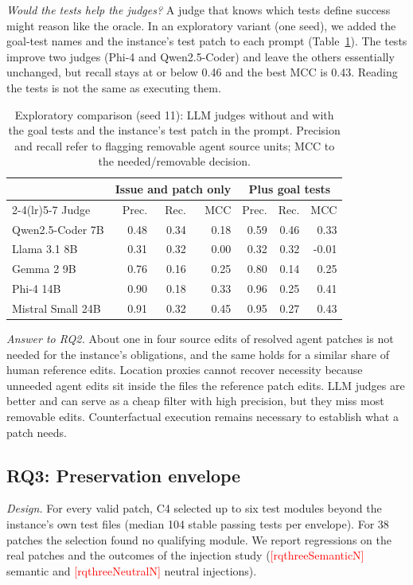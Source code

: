 \documentclass[a4paper,fleqn]{cas-sc}
\newcommand{\pending}[1]{\textcolor{red}{[#1]}}
\newcommand{\rqthreeEnvEmpty}{38}
\newcommand{\rqthreeEnvTestsMedian}{104}
\newcommand{\rqthreeNeutralN}{\pending{rqthreeNeutralN}}
\newcommand{\rqthreeSemanticN}{\pending{rqthreeSemanticN}}
\newcommand{\rqtwoInfMaxMcc}{0.43}
\newcommand{\rqtwoInfMaxRecall}{0.46}
\begin{document}
\emph{Would the tests help the judges?} A judge that knows which tests define success might reason like the oracle. In an exploratory variant (one seed), we added the goal-test names and the instance's test patch to each prompt (Table~\ref{tab:informed}). The tests improve two judges (Phi-4 and Qwen2.5-Coder) and leave the others essentially unchanged, but recall stays at or below \rqtwoInfMaxRecall{} and the best MCC is \rqtwoInfMaxMcc{}. Reading the tests is not the same as executing them.

\begin{table}[pos=htbp]
\caption{Exploratory comparison (seed 11): LLM judges without and with the goal tests and the instance's test patch in the prompt. Precision and recall refer to flagging removable agent source units; MCC to the needed/removable decision.}
\label{tab:informed}
\centering\footnotesize
\begin{tabular}{lrrrrrr}
\toprule
 & \multicolumn{3}{c}{Issue and patch only} & \multicolumn{3}{c}{Plus goal tests} \\
\cmidrule(lr){2-4}\cmidrule(lr){5-7}
Judge & Prec. & Rec. & MCC & Prec. & Rec. & MCC \\
\midrule
Qwen2.5-Coder 7B & 0.48 & 0.34 & 0.18 & 0.59 & 0.46 & 0.33 \\
Llama 3.1 8B & 0.31 & 0.32 & 0.00 & 0.32 & 0.32 & -0.01 \\
Gemma 2 9B & 0.76 & 0.16 & 0.25 & 0.80 & 0.14 & 0.25 \\
Phi-4 14B & 0.90 & 0.18 & 0.33 & 0.96 & 0.25 & 0.41 \\
Mistral Small 24B & 0.91 & 0.32 & 0.45 & 0.95 & 0.27 & 0.43 \\
\bottomrule
\end{tabular}
\end{table}

\emph{Answer to RQ2.} About one in four source edits of resolved agent patches is not needed for the instance's obligations, and the same holds for a similar share of human reference edits. Location proxies cannot recover necessity because unneeded agent edits sit inside the files the reference patch edits. LLM judges are better and can serve as a cheap filter with high precision, but they miss most removable edits. Counterfactual execution remains necessary to establish what a patch needs.


\subsection{RQ3: Preservation envelope}\label{sec:rq3}
\emph{Design.} For every valid patch, C4 selected up to six test modules beyond the instance's own test files (median \rqthreeEnvTestsMedian{} stable passing tests per envelope). For \rqthreeEnvEmpty{} patches the selection found no qualifying module. We report regressions on the real patches and the outcomes of the injection study (\rqthreeSemanticN{} semantic and \rqthreeNeutralN{} neutral injections).
\end{document}
